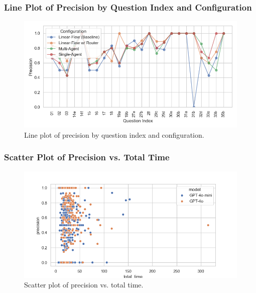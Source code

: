            \subsubsection{Line Plot of Precision by Question Index and Configuration}
            \begin{figure}[H]
                \centering
                \includegraphics[scale=0.75]{images_exp2/precision/precision_lineplot_by_question_index_and_configuration.png}
                \caption{Line plot of precision by question index and configuration.}
                \label{fig:precision_lineplot_by_question_index_and_configuration}
            \end{figure}

            \subsubsection{Scatter Plot of Precision vs. Total Time}
            \begin{figure}[H]
                \centering
                \includegraphics[scale=0.75]{images_exp2/precision/scatter_precision_vs_total_time.png}
                \caption{Scatter plot of precision vs. total time.}
                \label{fig:scatter_precision_vs_total_time}
            \end{figure}

